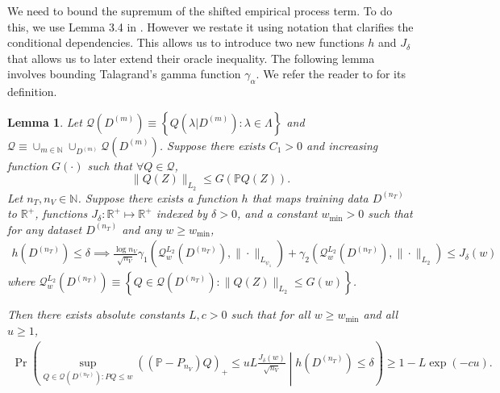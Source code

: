 \documentclass[10pt]{book}
\newtheorem{lemma}{Lemma}
\theoremstyle{definition}
\begin{document}
We need to bound the supremum of the shifted empirical process term.
To do this, we use Lemma 3.4 in \citet{lecue2012oracle}.
However we restate it using notation that clarifies the conditional dependencies.
This allows us to introduce two new functions $h$ and $J_\delta$ that allows us to later extend their oracle inequality.
The following lemma involves bounding Talagrand's gamma function $\gamma_\alpha$.
We refer the reader to \citet{talagrand2006generic} for its definition.
\begin{lemma}
Let $\mathcal{Q}(D^{(m)})\equiv\left\{ Q(\lambda|D^{(m)}):\lambda\in\Lambda\right\} $
and $\mathcal{Q}\equiv\cup_{m\in\mathbb{N}}\cup_{D^{(m)}}\mathcal{Q}(D^{(m)})$.
Suppose there exists $C_{1}>0$ and increasing function $G(\cdot)$
such that $\forall Q\in\mathcal{Q}$, 
\[
\|Q(Z)\|_{L_{2}}\le G\left(\mathbb{P}Q(Z)\right).
\]
Let $n_{T},n_{V}\in\mathbb{N}$.
Suppose there exists a function $h$ that maps training data $D^{(n_T)}$ to $\mathbb{R}^+$,
functions $J_\delta :\mathbb{R}^+ \mapsto \mathbb{R}^+$ indexed by $\delta > 0$,
and a constant $w_{\min}>0$ such that for any dataset $D^{(n_{T})}$ and any $w \ge w_{\min}$,
\begin{align}
h(D^{(n_{T})})\le\delta\implies\frac{\log n_{V}}{\sqrt{n_{V}}}\gamma_{1}\left(\mathcal{Q}_{w}^{L_{2}}(D^{(n_{T})}),\|\cdot\|_{L_{\psi_{1}}}\right)+\gamma_{2}\left(\mathcal{Q}_{w}^{L_{2}}(D^{(n_{T})}),\|\cdot\|_{L_{2}}\right)\le J_{\delta}(w)
\end{align}
where $\mathcal{Q}_{w}^{L_{2}}(D^{(n_{T})})\equiv\left\{ Q\in\mathcal{Q}(D^{(n_{T})}):\|Q(Z)\|_{L_{2}}\le G(w)\right\}$.

Then there exists absolute constants $L,c>0$ such that for all
$w\ge w_{\min}$ and all $u\ge1$,
\begin{align}
\Pr\left(
\sup_{Q\in\mathcal{Q}(D^{(n_{T})}): PQ \le w}
\left(\left(\mathbb{P}-P_{n_{V}}\right)Q\right)_{+}
\le uL\frac{J_{\delta}(w)}{\sqrt{n_{V}}}
\middle | h\left(D^{(n_{T})}\right)
\le \delta
\right)
\ge
1-L\exp(-cu).
\end{align}
\end{lemma}
\end{document}
